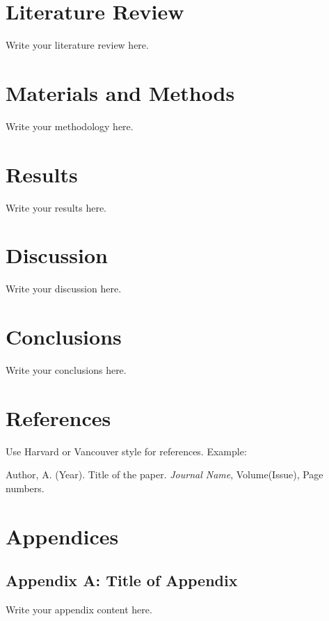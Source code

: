 \documentclass[12pt,a4paper]{article}
\begin{document}
\section{Literature Review}
Write your literature review here.

\section{Materials and Methods}
Write your methodology here.

\section{Results}
Write your results here.

\section{Discussion}
Write your discussion here.

\section{Conclusions}
Write your conclusions here.

\newpage
\section*{References}
Use Harvard or Vancouver style for references. Example:
\begin{thebibliography}{9}
 Author, A. (Year). Title of the paper. \textit{Journal Name}, Volume(Issue), Page numbers.
\end{thebibliography}

\newpage
\section*{Appendices}
\subsection*{Appendix A: Title of Appendix}
Write your appendix content here.
\end{document}
